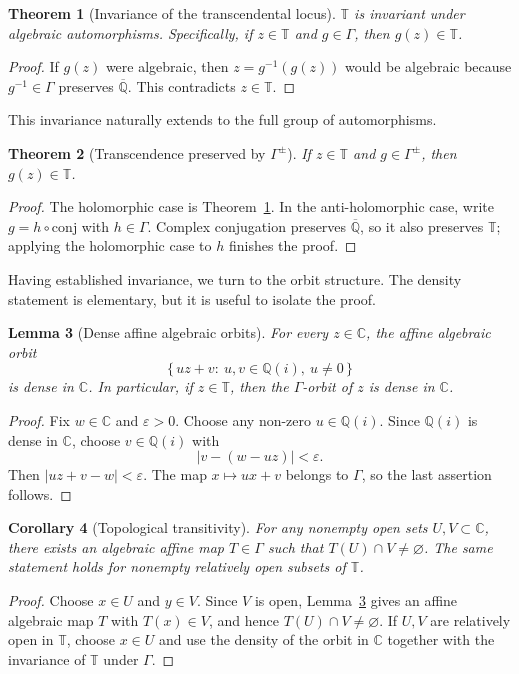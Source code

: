 \documentclass[11pt,a4paper]{article}
\theoremstyle{plain}
\newtheorem{theorem}{Theorem}[section]
\newtheorem{corollary}[theorem]{Corollary}
\newtheorem{lemma}[theorem]{Lemma}
\theoremstyle{definition}
\newcommand{\C}{\mathbb{C}}
\newcommand{\Q}{\mathbb{Q}}
\newcommand{\Alg}{\overline{\mathbb{Q}}}
\newcommand{\trans}{\mathbb{T}}
\newcommand{\Tc}{\trans}
\newcommand{\J}{\mathrm{conj}}
\begin{document}
\begin{theorem}[Invariance of the transcendental locus]\label{thm:preservation-transcendence}
	$\Tc$ is invariant under algebraic automorphisms. Specifically, if $z\in \Tc$ and $g\in\Gamma$, then $g(z) \in \Tc$.
\end{theorem}
\begin{proof}
	If $g(z)$ were algebraic, then $z=g^{-1}(g(z))$ would be algebraic because $g^{-1}\in\Gamma$ preserves $\Alg$. This contradicts $z\in\Tc$.
\end{proof}

This invariance naturally extends to the full group of automorphisms.

\begin{theorem}[Transcendence preserved by $\Gamma^{\pm}$]\label{thm:preservation-transcendence-anti}
	If $z\in \Tc$ and $g\in\Gamma^{\pm}$, then $g(z) \in \Tc$.
\end{theorem}
\begin{proof}
	The holomorphic case is Theorem~\ref{thm:preservation-transcendence}. In the anti-holomorphic case, write $g=h\circ\J$ with $h\in\Gamma$. Complex conjugation preserves $\Alg$, so it also preserves $\Tc$; applying the holomorphic case to $h$ finishes the proof.
\end{proof}

Having established invariance, we turn to the orbit structure. The density statement is elementary, but it is useful to isolate the proof.

\begin{lemma}[Dense affine algebraic orbits]\label{lem:dense-affine-orbits}
	For every $z\in\C$, the affine algebraic orbit
	\[
		\{\,uz+v:\ u,v\in\Q(i),\ u\ne0\,\}
	\]
	is dense in $\C$. In particular, if $z\in\Tc$, then the $\Gamma$-orbit of $z$ is dense in $\C$.
\end{lemma}
\begin{proof}
	Fix $w\in\C$ and $\varepsilon>0$. Choose any non-zero $u\in\Q(i)$. Since $\Q(i)$ is dense in $\C$, choose $v\in\Q(i)$ with
	\[
		|v-(w-uz)|<\varepsilon.
	\]
	Then $|uz+v-w|<\varepsilon$. The map $x\mapsto ux+v$ belongs to $\Gamma$, so the last assertion follows.
\end{proof}

\begin{corollary}[Topological transitivity]\label{cor:topological-transitivity}
	For any nonempty open sets $U,V\subset\C$, there exists an algebraic affine map $T\in\Gamma$ such that $T(U)\cap V\ne\varnothing$. The same statement holds for nonempty relatively open subsets of $\Tc$.
\end{corollary}
\begin{proof}
	Choose $x\in U$ and $y\in V$. Since $V$ is open, Lemma~\ref{lem:dense-affine-orbits} gives an affine algebraic map $T$ with $T(x)\in V$, and hence $T(U)\cap V\ne\varnothing$. If $U,V$ are relatively open in $\Tc$, choose $x\in U$ and use the density of the orbit in $\C$ together with the invariance of $\Tc$ under $\Gamma$.
\end{proof}
\end{document}
